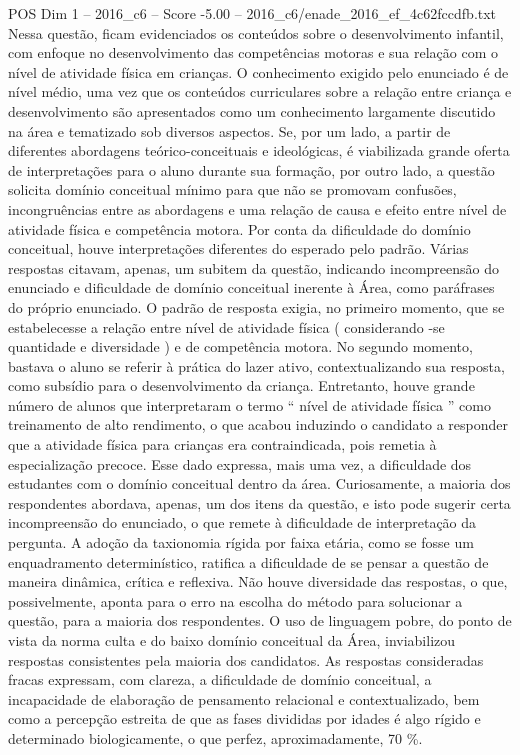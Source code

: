 \begin{textsample}{POS Dim 1 – 2016\_c6 – Score -5.00 – 2016\_c6/enade\_2016\_ef\_4c62fccdfb.txt}
Nessa questão, ficam evidenciados os conteúdos sobre o desenvolvimento infantil, com enfoque no desenvolvimento das competências motoras e sua relação com o nível de atividade física em crianças.
O conhecimento exigido pelo enunciado é de nível médio, uma vez que os conteúdos curriculares sobre a relação entre criança e desenvolvimento são apresentados como um conhecimento largamente discutido na área e tematizado sob diversos aspectos.
Se, por um lado, a partir de diferentes abordagens teórico-conceituais e ideológicas, é viabilizada grande oferta de interpretações para o aluno durante sua formação, por outro lado, a questão solicita domínio conceitual mínimo para que não se promovam confusões, incongruências entre as abordagens e uma relação de causa e efeito entre nível de atividade física e competência motora.
Por conta da dificuldade do domínio conceitual, houve interpretações diferentes do esperado pelo padrão.
Várias respostas citavam, apenas, um subitem da questão, indicando incompreensão do enunciado e dificuldade de domínio conceitual inerente à Área, como paráfrases do próprio enunciado.
O padrão de resposta exigia, no primeiro momento, que se estabelecesse a relação entre nível de atividade física ( considerando -se quantidade e diversidade ) e de competência motora.
No segundo momento, bastava o aluno se referir à prática do lazer ativo, contextualizando sua resposta, como subsídio para o desenvolvimento da criança.
Entretanto, houve grande número de alunos que interpretaram o termo “ nível de atividade física ” como treinamento de alto rendimento, o que acabou induzindo o candidato a responder que a atividade física para crianças era contraindicada, pois remetia à especialização precoce.
Esse dado expressa, mais uma vez, a dificuldade dos estudantes com o domínio conceitual dentro da área.
Curiosamente, a maioria dos respondentes abordava, apenas, um dos itens da questão, e isto pode sugerir certa incompreensão do enunciado, o que remete à dificuldade de interpretação da pergunta.
A adoção da taxionomia rígida por faixa etária, como se fosse um enquadramento determinístico, ratifica a dificuldade de se pensar a questão de maneira dinâmica, crítica e reflexiva.
Não houve diversidade das respostas, o que, possivelmente, aponta para o erro na escolha do método para solucionar a questão, para a maioria dos respondentes.
O uso de linguagem pobre, do ponto de vista da norma culta e do baixo domínio conceitual da Área, inviabilizou respostas consistentes pela maioria dos candidatos.
As respostas consideradas fracas expressam, com clareza, a dificuldade de domínio conceitual, a incapacidade de elaboração de pensamento relacional e contextualizado, bem como a percepção estreita de que as fases divididas por idades é algo rígido e determinado biologicamente, o que perfez, aproximadamente, 70 \%.

\end{textsample}
